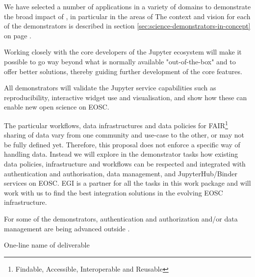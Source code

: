 \begin{workpackage}
\begin{wpdescription}
  We have selected a number of applications in a variety of domains
  to demonstrate the broad impact of \TheProject, in particular in the
  areas of 
  The context and vision for each of the demonstrators is described in
  section \ref{sec:science-demonstrators-in-concept} on page
  \pageref{sec:science-demonstrators-in-concept}.

  Working closely with the core developers of the Jupyter ecosystem will make it possible to
  go way beyond what is normally available "out-of-the-box" and to offer better solutions,
  thereby guiding further development of the core features.

  \medskip

  All demonstrators will validate the Jupyter service capabilities such as reproducibility,
  interactive widget use and visualisation, and show how these can
  enable new open science on EOSC.

  The particular workflows, data infrastructures and data policies for
  FAIR\footnote{Findable, Accessible, Interoperable and Reusable} sharing of data vary from one community and use-case to
  the other, or may not be fully defined yet. Therefore, this proposal
  does not enforce a specific way of handling data. Instead we
  will explore in the demonstrator tasks how existing data policies,
  infrastructure and workflows can be respected and integrated with
  authentication and authorisation, data management, and
  JupyterHub/Binder services on EOSC. EGI is a partner
  for all the tasks in this work package and will work with us to find the
  best integration solutions in the evolving EOSC
  infrastructure.

  For some of the demonstrators, authentication and authorization and/or
  data management are being advanced outside \TheProject.


\end{wpdescription}

\begin{tasklist}



\end{tasklist}



\begin{wpdelivs}
\begin{wpdeliv}[
    id=deliv,
    lead=XXX,
    due=12,
    miles=startup,
    dissem=PU,
    nature=DEC,
]
  {
  One-line name of deliverable
  }
\end{wpdeliv}


\end{wpdelivs}
\end{workpackage}
